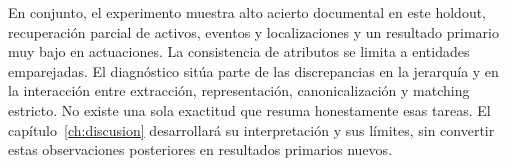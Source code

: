 En conjunto, el experimento muestra alto acierto documental en este holdout,
recuperación parcial de activos, eventos y localizaciones y un resultado
primario muy bajo en actuaciones. La consistencia de atributos se limita
a entidades emparejadas. El diagnóstico sitúa parte de las discrepancias
en la jerarquía y en la interacción entre extracción, representación,
canonicalización y matching estricto. No existe una sola exactitud que
resuma honestamente esas tareas. El capítulo~\ref{ch:discusion} desarrollará
su interpretación y sus límites, sin convertir estas observaciones
posteriores en resultados primarios nuevos.
